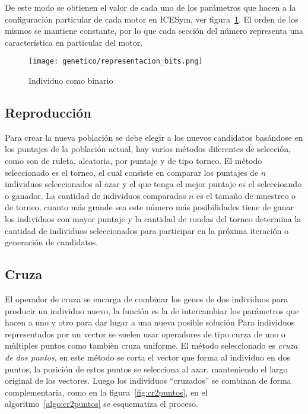 De este modo se obtienen el valor de cada uno de los parámetros que hacen a la
configuración particular de cada motor en ICESym, ver figura~\ref{fig:pop_bit}.
%
El orden de los mismos se mantiene constante, por lo que cada sección del número
representa una característica en particular del motor.
%

\begin{figure}[ht]
  \centering
  \texttt{[image: genetico/representacion\_bits.png]}
  \caption{Individuo como binario}\label{fig:pop_bit}
\end{figure}


\subsection{Reproducción}

Para crear la nueva población se debe elegir a los nuevos candidatos basándose
en los puntajes de la población actual, hay varios métodos diferentes de
selección, como son de ruleta, aleatoria, por puntaje y de tipo torneo.
%
El método seleccionado es el torneo, el cual consiste en comparar los puntajes
de $n$ individuos seleccionados al azar y el que tenga el mejor puntaje es el
seleccioando o ganador.
%
La cantidad de individuos comparados $n$ es el tamaño de muestreo o de torneo,
cuanto más grande sea este número más posibilidades tiene de ganar los
individuos con mayor puntaje y la cantidad de rondas del torneo determina la
cantidad de individuos seleccionados para participar en la próxima iteración o
generación de candidatos.


\subsection{Cruza}
%
El operador de cruza se encarga de combinar los genes de dos individuos para
producir un individuo nuevo, la función es la de intercambiar los parámetros que
hacen a uno y otro para dar lugar a una nueva posible solución
%
Para individuos representados por un vector se suelen usar operadores de tipo
curza de uno o mùltiples puntos como tambièn cruza uniforme.
%
El método seleccionado es \emph{cruza de dos puntos}, en este método
se corta el vector que forma al individuo en dos puntos, la posición de estos
puntos se selecciona al azar, manteniendo el largo original de los vectores.
%
Luego los individuos ``cruzados'' se combinan de forma complementaria, como en
la figura~\ref{fig:cr2puntos}, en el algoritmo~\ref{algo:cr2puntos} se esquematiza
el proceso.

